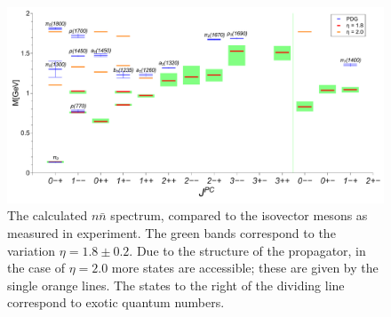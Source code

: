 \begin{figure}[h]
\begin{center}
\includegraphics[width=0.999\textwidth]{figures/spectrum_nn}
\caption{\footnotesize The calculated $n\bar{n}$ spectrum, compared to the isovector mesons as measured in 
experiment. The green bands correspond to the 
variation $\eta=1.8\pm0.2$. Due to the structure of the propagator, in the case of $\eta=2.0$ more states are accessible; 
these are given by the single orange lines. The states to the right of the dividing line correspond to exotic quantum 
numbers.}\label{fig:spectrumnn}
\end{center}
\end{figure}
